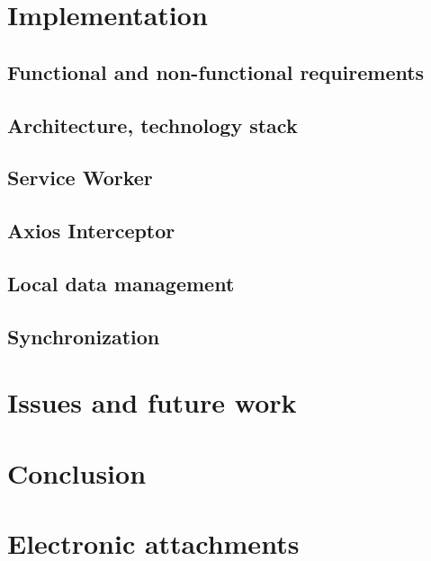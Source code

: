 \documentclass[
  digital,     %
  color,       %
  oneside,     %
  nosansbold,  %
  nocolorbold, %
  lof,         %
  lot,         %
]{fithesis4}
\begin{document}
\chapter{Implementation}
\section{Functional and non-functional requirements}
\section{Architecture, technology stack}
\section{Service Worker}
\section{Axios Interceptor}
\section{Local data management}
\section{Synchronization}

\chapter{Issues and future work}

\chapter*{Conclusion}

\setcounter{biburllcpenalty}{7000}
\setcounter{biburlucpenalty}{8000}
\printbibliography[heading=bibintoc] %

\appendix %
\chapter{Electronic attachments}
\end{document}
